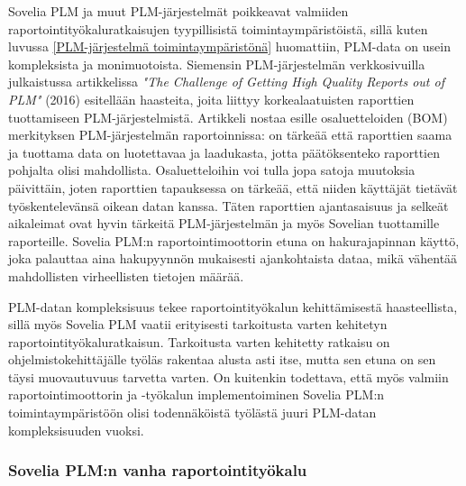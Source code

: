 Sovelia PLM ja muut PLM-järjestelmät poikkeavat valmiiden raportointityökaluratkaisujen tyypillisistä toimintaympäristöistä, sillä kuten luvussa \ref{PLM-järjestelmä toimintaympäristönä} huomattiin, PLM-data on usein kompleksista ja monimuotoista. Siemensin PLM-järjestelmän verkkosivuilla julkaistussa artikkelissa \textit{"The Challenge of Getting High Quality Reports out of PLM"} \cite{german_challenge_2016} (2016) esitellään haasteita, joita liittyy korkealaatuisten raporttien tuottamiseen PLM-järjestelmistä. Artikkeli nostaa esille osaluetteloiden (BOM) merkityksen PLM-järjestelmän raportoinnissa: on tärkeää että raporttien saama ja tuottama data on luotettavaa ja laadukasta, jotta päätöksenteko raporttien pohjalta olisi mahdollista. Osaluetteloihin voi tulla jopa satoja muutoksia päivittäin, joten raporttien tapauksessa on tärkeää, että niiden käyttäjät tietävät työskentelevänsä oikean datan kanssa. Täten raporttien ajantasaisuus ja selkeät aikaleimat ovat hyvin tärkeitä PLM-järjestelmän ja myös Sovelian tuottamille raporteille. Sovelia PLM:n raportointimoottorin etuna on hakurajapinnan käyttö, joka palauttaa aina hakupyynnön mukaisesti ajankohtaista dataa, mikä vähentää mahdollisten virheellisten tietojen määrää.

PLM-datan kompleksisuus tekee raportointityökalun kehittämisestä haasteellista, sillä myös Sovelia PLM vaatii erityisesti tarkoitusta varten kehitetyn raportointityökaluratkaisun. Tarkoitusta varten kehitetty ratkaisu on ohjelmistokehittäjälle työläs rakentaa alusta asti itse, mutta sen etuna on sen täysi muovautuvuus tarvetta varten. On kuitenkin todettava, että myös valmiin raportointimoottorin ja -työkalun implementoiminen Sovelia PLM:n toimintaympäristöön olisi todennäköistä työlästä juuri PLM-datan kompleksisuuden vuoksi.

\subsubsection{Sovelia PLM:n vanha raportointityökalu}

